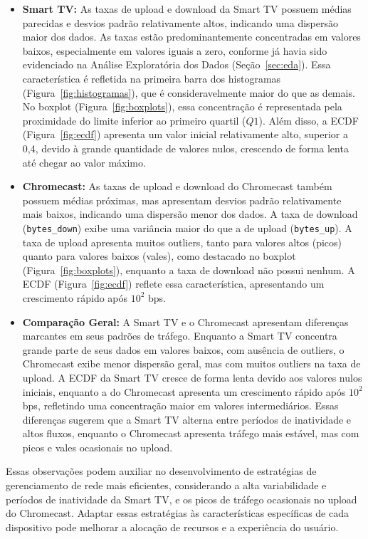 \begin{itemize}

\item \textbf{Smart TV:} 
As taxas de upload e download da Smart TV possuem médias parecidas e desvios padrão relativamente altos, indicando uma dispersão maior dos dados. As taxas estão predominantemente concentradas em valores baixos, especialmente em valores iguais a zero, conforme já havia sido evidenciado na Análise Exploratória dos Dados (Seção~\ref{sec:eda}). Essa característica é refletida na primeira barra dos histogramas (Figura~\ref{fig:histogramas}), que é consideravelmente maior do que as demais. No boxplot (Figura~\ref{fig:boxplots}), essa concentração é representada pela proximidade do limite inferior ao primeiro quartil (\( Q1 \)). Além disso, a ECDF (Figura~\ref{fig:ecdf}) apresenta um valor inicial relativamente alto, superior a 0,4, devido à grande quantidade de valores nulos, crescendo de forma lenta até chegar ao valor máximo.

\item \textbf{Chromecast:} 
As taxas de upload e download do Chromecast também possuem médias próximas, mas apresentam desvios padrão relativamente mais baixos, indicando uma dispersão menor dos dados. A taxa de download (\texttt{bytes\_down}) exibe uma variância maior do que a de upload (\texttt{bytes\_up}). A taxa de upload apresenta muitos outliers, tanto para valores altos (picos) quanto para valores baixos (vales), como destacado no boxplot (Figura~\ref{fig:boxplots}), enquanto a taxa de download não possui nenhum. A ECDF (Figura~\ref{fig:ecdf}) reflete essa característica, apresentando um crescimento rápido após \(10^2\) bps.

\item \textbf{Comparação Geral:} A Smart TV e o Chromecast apresentam diferenças marcantes em seus padrões de tráfego. Enquanto a Smart TV concentra grande parte de seus dados em valores baixos, com ausência de outliers, o Chromecast exibe menor dispersão geral, mas com muitos outliers na taxa de upload. A ECDF da Smart TV cresce de forma lenta devido aos valores nulos iniciais, enquanto a do Chromecast apresenta um crescimento rápido após \(10^2\) bps, refletindo uma concentração maior em valores intermediários. Essas diferenças sugerem que a Smart TV alterna entre períodos de inatividade e altos fluxos, enquanto o Chromecast apresenta tráfego mais estável, mas com picos e vales ocasionais no upload.

\end{itemize}Essas observações podem auxiliar no desenvolvimento de estratégias de gerenciamento de rede mais eficientes, considerando a alta variabilidade e períodos de inatividade da Smart TV, e os picos de tráfego ocasionais no upload do Chromecast. Adaptar essas estratégias às características específicas de cada dispositivo pode melhorar a alocação de recursos e a experiência do usuário.
